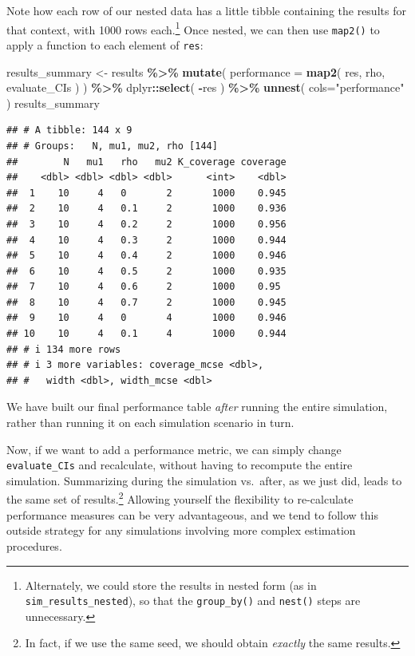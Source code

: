 \documentclass[
]{book}
\newenvironment{Shaded}{\begin{snugshade}}{\end{snugshade}}
\newcommand{\AttributeTok}[1]{\textcolor[rgb]{0.13,0.29,0.53}{#1}}
\newcommand{\FunctionTok}[1]{\textcolor[rgb]{0.13,0.29,0.53}{\textbf{#1}}}
\newcommand{\NormalTok}[1]{#1}
\newcommand{\OtherTok}[1]{\textcolor[rgb]{0.56,0.35,0.01}{#1}}
\newcommand{\SpecialCharTok}[1]{\textcolor[rgb]{0.81,0.36,0.00}{\textbf{#1}}}
\newcommand{\StringTok}[1]{\textcolor[rgb]{0.31,0.60,0.02}{#1}}
\begin{document}
Note how each row of our nested data has a little tibble containing the results for that context, with 1000 rows each.\footnote{Alternately, we could store the results in nested form (as in \texttt{sim\_results\_nested}), so that the \texttt{group\_by()} and \texttt{nest()} steps are unnecessary.}
Once nested, we can then use \texttt{map2()} to apply a function to each element of \texttt{res}:

\begin{Shaded}
\begin{Highlighting}[]
\NormalTok{results\_summary }\OtherTok{\textless{}{-}} 
\NormalTok{  results }\SpecialCharTok{\%\textgreater{}\%}
  \FunctionTok{mutate}\NormalTok{( }\AttributeTok{performance =} \FunctionTok{map2}\NormalTok{( res, rho, evaluate\_CIs ) ) }\SpecialCharTok{\%\textgreater{}\%}
\NormalTok{  dplyr}\SpecialCharTok{::}\FunctionTok{select}\NormalTok{( }\SpecialCharTok{{-}}\NormalTok{res ) }\SpecialCharTok{\%\textgreater{}\%}
  \FunctionTok{unnest}\NormalTok{( }\AttributeTok{cols=}\StringTok{"performance"}\NormalTok{ ) }
\NormalTok{results\_summary}
\end{Highlighting}
\end{Shaded}

\begin{verbatim}
## # A tibble: 144 x 9
## # Groups:   N, mu1, mu2, rho [144]
##        N   mu1   rho   mu2 K_coverage coverage
##    <dbl> <dbl> <dbl> <dbl>      <int>    <dbl>
##  1    10     4   0       2       1000    0.945
##  2    10     4   0.1     2       1000    0.936
##  3    10     4   0.2     2       1000    0.956
##  4    10     4   0.3     2       1000    0.944
##  5    10     4   0.4     2       1000    0.946
##  6    10     4   0.5     2       1000    0.935
##  7    10     4   0.6     2       1000    0.95 
##  8    10     4   0.7     2       1000    0.945
##  9    10     4   0       4       1000    0.946
## 10    10     4   0.1     4       1000    0.944
## # i 134 more rows
## # i 3 more variables: coverage_mcse <dbl>,
## #   width <dbl>, width_mcse <dbl>
\end{verbatim}

We have built our final performance table \emph{after} running the entire simulation, rather than running it on each simulation scenario in turn.

Now, if we want to add a performance metric, we can simply change \texttt{evaluate\_CIs} and recalculate, without having to recompute the entire simulation.
Summarizing during the simulation vs.~after, as we just did, leads to the same set of results.\footnote{In fact, if we use the same seed, we should obtain \emph{exactly} the same results.}
Allowing yourself the flexibility to re-calculate performance measures can be very advantageous, and we tend to follow this outside strategy for any simulations involving more complex estimation procedures.
\end{document}
